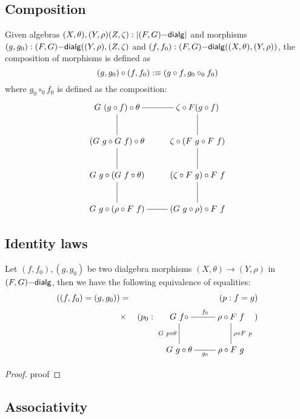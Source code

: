 \subsection{Composition}

Given algebras $(X,\theta),(Y,\rho)(Z,\zeta) : | (F,G)\mathsf{-dialg} |$
and morphisms $(g,g_0) : (F,G)\mathsf{-dialg}((Y,\rho),(Z,\zeta)$ and
$(f,f_0) : (F,G)\mathsf{-dialg}((X,\theta),(Y,\rho))$, the composition of morphisms is defined as
$$
(g,g_0) \circ (f,f_0) :\equiv (g \circ f , g_0 \circ_0 f_0)
$$
where $g_0 \circ_0 f_0$ is defined as the composition:
$$
\xymatrix{
G\ (g \circ f) \circ \theta
\ar@{-}[r]
\ar@{-}[d]
&\zeta \circ F(g \circ f)
\ar@{-}[d]
\\
(G\ g \circ G\ f) \circ \theta
\ar@{-}[d]
&\zeta \circ (F\ g \circ F\ f)
\ar@{-}[d]
\\
G\ g \circ (G\ f \circ \theta)
\ar@{-}[d]
&(\zeta \circ F\ g) \circ F\ f
\ar@{-}[d]
\\
G\ g \circ (\rho \circ F\ f)
\ar@{-}[r]
&(G\ g \circ \rho) \circ F\ f
}
$$

\subsection{Identity laws}

\begin{proposition}
  Let $(f,f_0),(g,g_0)$ be two dialgebra morphisms
  $(X,\theta) \to (Y,\rho)$ in $(F,G)\mathsf{-dialg}$, then we have the
  following equivalence of equalities:
  \begin{align*}
    ((f,f_0) = (g,g_0)) &= &(p : f = g)\\
    &\times &(p_0 : 
              \xymatrix{
              G\ f \circ
              \ar@{-}[r]^{f_0}
              \ar@{-}[d]_{G\ p \circ \theta}
              &\rho \circ F\ f
              \ar@{-}[d]^{\rho \circ F\ p}
              \\
              G\ g \circ \theta
              \ar@{-}[r]_{g_0}
              &\rho \circ F\ g
              })
  \end{align*}
\end{proposition}

\begin{proof}
  proof
\end{proof}

\subsection{Associativity}

